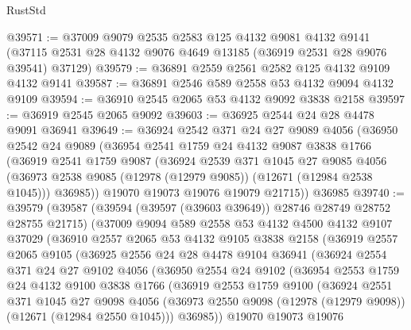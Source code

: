 \begin{lexlean}{RustStd}
\begin{coremodule}
@39571 := @37009
    @9079
    @2535
    @2583
    @125
    @4132
    @9081
    @4132
    @9141
    (@37115 @2531 @28 @4132 @9076 @4649 @13185 (@36919 @2531 @28 @9076 @39541) @37129)
@39579 := @36891 @2559 @2561 @2582 @125 @4132 @9109 @4132 @9141
@39587 := @36891 @2546 @589 @2558 @53 @4132 @9094 @4132 @9109
@39594 := @36910 @2545 @2065 @53 @4132 @9092 @3838 @2158
@39597 := @36919 @2545 @2065 @9092
@39603 := @36925 @2544 @24 @28 @4478 @9091 @36941
@39649 := @36924
    @2542
    @371
    @24
    @27
    @9089
    @4056
    (@36950
      @2542
      @24
      @9089
      (@36954
        @2541
        @1759
        @24
        @4132
        @9087
        @3838
        @1766
        (@36919
          @2541
          @1759
          @9087
          (@36924
            @2539
            @371
            @1045
            @27
            @9085
            @4056
            (@36973 @2538 @9085 (@12978 (@12979 @9085)) (@12671 (@12984 @2538 @1045)))
            @36985))
        @19070
        @19073
        @19076
        @19079
        @21715))
    @36985
@39740 := @39579
    (@39587
      (@39594 (@39597 (@39603 @39649)) @28746 @28749 @28752 @28755 @21715)
      (@37009
        @9094
        @589
        @2558
        @53
        @4132
        @4500
        @4132
        @9107
        @37029
        (@36910
          @2557
          @2065
          @53
          @4132
          @9105
          @3838
          @2158
          (@36919
            @2557
            @2065
            @9105
            (@36925
              @2556
              @24
              @28
              @4478
              @9104
              @36941
              (@36924
                @2554
                @371
                @24
                @27
                @9102
                @4056
                (@36950
                  @2554
                  @24
                  @9102
                  (@36954
                    @2553
                    @1759
                    @24
                    @4132
                    @9100
                    @3838
                    @1766
                    (@36919
                      @2553
                      @1759
                      @9100
                      (@36924
                        @2551
                        @371
                        @1045
                        @27
                        @9098
                        @4056
                        (@36973 @2550 @9098 (@12978 (@12979 @9098)) (@12671 (@12984 @2550 @1045)))
                        @36985))
                    @19070
                    @19073
                    @19076

\end{coremodule}
\end{lexlean}

